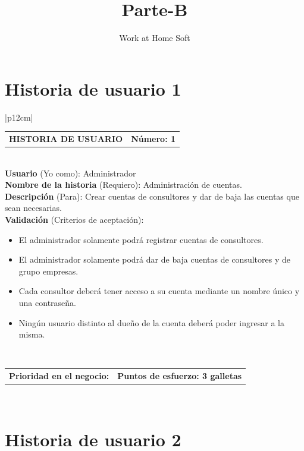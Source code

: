 \documentclass[11pt,letterpaper]{report}
\title{\Huge Parte-B}
\author{Work at Home Soft}
\begin{document}
	
	\tableofcontents
	
	\section{Historia de usuario 1}
	\begin{center}	
	\begin{tabular}{|p{12cm}|}
		\hline
		\begin{tabular}{c|c}
			\textbf{HISTORIA DE USUARIO} & \textbf{Número: 1} \\
		\end{tabular} \\ \hline
		\textbf{Usuario} (Yo como): Administrador \\ \hline
		\textbf{Nombre de la historia} (Requiero): Administración de cuentas. \\ \hline
		\textbf{Descripción} (Para): Crear cuentas de consultores y dar de baja las cuentas que sean necesarias. \\ \hline
		\textbf{Validación} (Criterios de aceptación): \\
		\begin{minipage}{12cm}
			\begin{itemize}
				\item El administrador solamente podrá registrar cuentas de consultores.
				\item El administrador solamente podrá dar de baja cuentas de consultores y de grupo empresas.
				\item Cada consultor deberá tener acceso a su cuenta mediante un nombre único y una contraseña.
				\item Ningún usuario distinto al dueño de la cuenta deberá poder ingresar a la misma.
			\end{itemize}
		\end{minipage} \\ \hline
				\begin{tabular}{p{6cm}|c}
					\textbf{Prioridad en el negocio: } & \textbf{Puntos de esfuerzo: 3 galletas} \\
				\end{tabular} \\ \hline
	\end{tabular}
	\end{center}
	
	\section{Historia de usuario 2}
	
\end{document}

